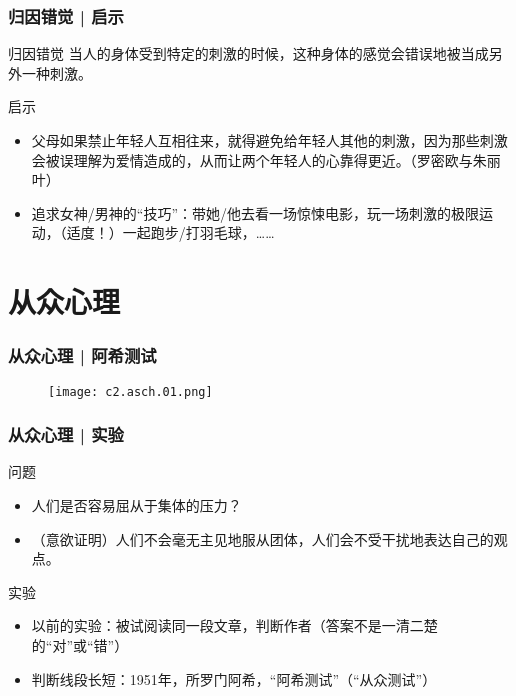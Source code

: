 \begin{frame}
  \frametitle{归因错觉 | \alert{启示}}
  \begin{block}{归因错觉}
    当人的身体受到特定的刺激的时候，这种身体的感觉会错误地被当成另外一种刺激。
  \end{block}
  \pause
  \begin{block}{启示}
    \begin{itemize}
      \item 父母如果禁止年轻人互相往来，就得避免给年轻人其他的刺激，因为那些刺激会被误理解为爱情造成的，从而让两个年轻人的心靠得更近。（罗密欧与朱丽叶）
      \item 追求女神/男神的“技巧”：带她/他去看一场惊悚电影，玩一场刺激的极限运动，（适度！）一起跑步/打羽毛球，……
    \end{itemize}
  \end{block}
\end{frame}

\section{从众心理}
\begin{frame}
  \frametitle{从众心理 | 阿希测试}
  \begin{figure}
    \centering
    \texttt{[image: c2.asch.01.png]}
  \end{figure}
\end{frame}

\begin{frame}
  \frametitle{从众心理 | 实验}
  \begin{block}{问题}
    \begin{itemize}
      \item 人们是否容易屈从于集体的压力？
      \item （意欲证明）人们不会毫无主见地服从团体，人们会不受干扰地表达自己的观点。
    \end{itemize}
  \end{block}
  \pause
  \begin{block}{实验}
    \begin{itemize}
      \item 以前的实验：被试阅读同一段文章，判断作者（答案不是一清二楚的“对”或“错”）
      \item 判断线段长短：1951年，所罗门\textbullet 阿希，“阿希测试”（“从众测试”）
    \end{itemize}
  \end{block}
\end{frame}

